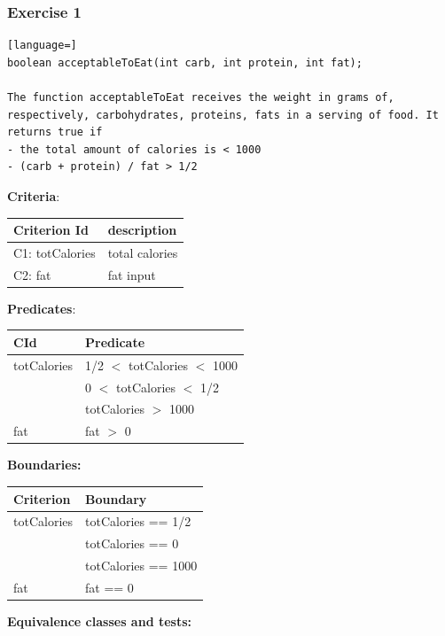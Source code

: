\documentclass[12pt]{article}
\begin{document}
\subsubsection{Exercise 1}
\begin{lstlisting}[language=]
boolean acceptableToEat(int carb, int protein, int fat);

The function acceptableToEat receives the weight in grams of, respectively, carbohydrates, proteins, fats in a serving of food. It returns true if
- the total amount of calories is < 1000
- (carb + protein) / fat > 1/2
\end{lstlisting}
\textbf{Criteria}:
\begin{center}
  \begin{tabular}{|l|l|}
    \hline
    Criterion Id & description \\
    \hline
    C1: totCalories & total calories \\
    \hline
    C2: fat & fat input \\
    \hline
  \end{tabular}
\end{center}
\textbf{Predicates}:
\begin{center}
  \begin{tabular}{|l|l|}
    \hline
    CId & Predicate \\
    \hline
    totCalories & 1/2 $<$ totCalories $<$ 1000 \\
    \hline
    & 0 $<$ totCalories $<$ 1/2 \\
    \hline
    & totCalories $>$ 1000 \\
    \hline
    fat & fat $>$ 0 \\ 
    \hline
  \end{tabular}
\end{center}
\textbf{Boundaries:}
\begin{center}
  \begin{tabular}{|l|l|}
    \hline
    Criterion & Boundary \\
    \hline
    totCalories & totCalories == 1/2 \\
    \hline
    & totCalories == 0 \\
    \hline
    & totCalories == 1000 \\
    \hline
    fat & fat == 0 \\
    \hline
  \end{tabular}
\end{center}
\textbf{Equivalence classes and tests:}
\end{document}

